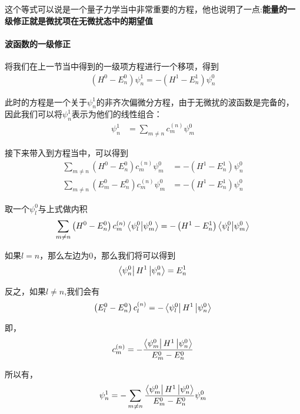 \documentclass{article}
\begin{document}
这个等式可以说是一个量子力学当中非常重要的方程，他也说明了一点:\textbf{能量的一级修正就是微扰项在无微扰态中的期望值}

\paragraph{波函数的一级修正}将我们在上一节当中得到的一级项方程进行一个移项，得到
\begin{align*}
	\left(H^0-E_n^0\right)\psi_n^1=-\left(H^1-E_n^1\right)\psi_n^0
\end{align*}

此时的方程是一个关于$\psi_n^1$的非齐次偏微分方程，由于无微扰的波函数是完备的，因此我们可以将$\psi_n^1$表示为他们的线性组合：
\begin{align*}
	\psi_n^1 & =\sum_{m\neq n}c_m^{(n)}\psi_m^0
\end{align*}

接下来带入到方程当中，可以得到
\begin{align*}
	\sum_{m\neq n}\left(H^0-E_n^0\right)c_m^{(n)}\psi_m^0   & =-\left(H^1-E_n^1\right)\psi_n^0 \\
	\sum_{m\neq n}\left(E_m^0-E_n^0\right)c_m^{(n)}\psi_m^0 & =-\left(H^1-E_n^1\right)\psi_n^0
\end{align*}

取一个$\psi_l^0$与上式做内积
\begin{align*}
	\sum_{m\neq n}\left(H^0-E_n^0\right)c_m^{(n)}\braket{\psi_l^0}{\psi_m^0} & =-\left(H^1-E_n^1\right)\braket{\psi_l^0}{\psi_m^0} \\
\end{align*}

如果$l=n$，那么左边为$0$，那么我们将可以得到
\begin{equation*}
	\bra{\psi_n^0}H^1\ket{\psi_n^0}=E_n^1
\end{equation*}

反之，如果$l\neq n$,我们会有
\begin{align*}
	\left(E_l^0-E_n^0\right)c_l^{(n)}=-\bra{\psi_l^0}H^1\ket{\psi_n^0}
\end{align*}

即，
\begin{align*}
	c_m^{(n)}=-\dfrac{\bra{\psi_m^0}H^1\ket{\psi_n^0}}{E_m^0-E_n^0}
\end{align*}

所以有，
\begin{align*}
	\psi_n^1=-\sum_{m\neq n}\dfrac{\bra{\psi_m^0}H^1\ket{\psi_n^0}}{E_m^0-E_n^0}\psi_m^0
\end{align*}
\end{document}
